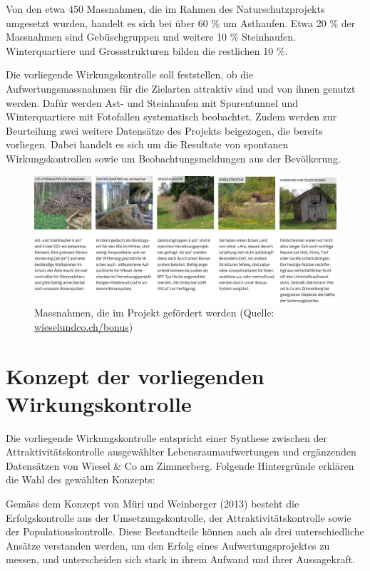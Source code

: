 \documentclass[
  oneside]{scrbook}
\begin{document}
Von den etwa 450 Massnahmen, die im Rahmen des Naturschutzprojekts umgesetzt wurden, handelt es sich bei über 60 \% um Asthaufen. Etwa 20 \% der Massnahmen sind Gebüschgruppen und weitere 10 \% Steinhaufen. Winterquartiere und Grossstrukturen bilden die restlichen 10 \%.

Die vorliegende Wirkungskontrolle soll feststellen, ob die Aufwertungsmassnahmen für die Zielarten attraktiv sind und von ihnen genutzt werden. Dafür werden Ast- und Steinhaufen mit Spurentunnel und Winterquartiere mit Fotofallen systematisch beobachtet. Zudem werden zur Beurteilung zwei weitere Datensätze des Projekts beigezogen, die bereits vorliegen. Dabei handelt es sich um die Resultate von spontanen Wirkungskontrollen sowie um Beobachtungsmeldungen aus der Bevölkerung.



\begin{figure}[H]
\includegraphics[width=1\linewidth]{images/massnahmen} \caption{Massnahmen, die im Projekt gefördert werden (Quelle: \href{http://www.wieselundco.ch/bonus}{wieselundco.ch/bonus})}\label{fig:massnahmen}
\end{figure}

\hypertarget{konzept-der-vorliegenden-wirkungskontrolle}{%
\chapter{Konzept der vorliegenden Wirkungskontrolle}\label{konzept-der-vorliegenden-wirkungskontrolle}}

Die vorliegende Wirkungskontrolle entspricht einer Synthese zwischen der Attraktivitätskontrolle ausgewählter Lebensraumaufwertungen und ergänzenden Datensätzen von Wiesel \& Co am Zimmerberg. Folgende Hintergründe erklären die Wahl des gewählten Konzepts:

Gemäss dem Konzept von Müri und Weinberger (2013) besteht die Erfolgskontrolle aus der Umsetzungskontrolle, der Attraktivitätskontrolle sowie der Populationskontrolle. Diese Bestandteile können auch als drei unterschiedliche Ansätze verstanden werden, um den Erfolg eines Aufwertungsprojektes zu messen, und unterscheiden sich stark in ihrem Aufwand und ihrer Aussagekraft.
\end{document}
